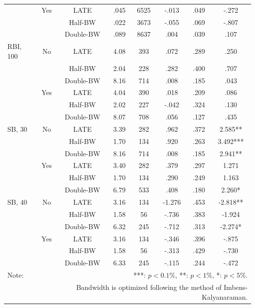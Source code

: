 \documentclass[dvipdfmx, 12pt]{article}
\begin{document}
\begin{table}[!]
\begin{tabular}{lccccccc}
    & Yes & LATE & .045 & 6525 & -.013 & .049 & -.272 \\
    & & Half-BW & .022 & 3673 & -.055 & .069 & -.807 \\
    & &Double-BW & .089 & 8637 & .004 & .039 & .107 \\ \hline

    RBI, 100 & No & LATE & 4.08 & 393 & .072 & .289 & .250 \\
    & &Half-BW & 2.04 & 228 & .282 & .400 & .707 \\
    & &Double-BW & 8.16 & 714 & .008 & .185 & .043 \\ \cline{3-8}

    & Yes & LATE & 4.04 & 390 & .018 & .209 & .086 \\
    & & Half-BW & 2.02 & 227 & -.042 & .324 & .130 \\
    & & Double-BW & 8.07 & 708 & .056 & .127 & .435 \\ \hline

    SB, 30 & No & LATE & 3.39 & 282 & .962 & .372 & 2.585** \\
    & &Half-BW & 1.70 & 134 & .920 & .263 & 3.492*** \\
    & &Double-BW & 8.16 & 714 & .008 & .185 & 2.941** \\ \cline{3-8}

    & Yes & LATE & 3.40 & 282 & .379 & .297 & 1.271 \\
    & & Half-BW & 1.70 & 134 & .290 & .249 & 1.163 \\
    & & Double-BW & 6.79 & 533 & .408 & .180 & 2.260* \\ \hline

    SB, 40 & No & LATE & 3.16 & 134 & -1.276 & .453 & -2.818** \\
    & &Half-BW & 1.58 & 56 & -.736 & .383 & -1.924 \\
    & &Double-BW & 6.32 & 245 & -.712 & .313 & -2.274* \\ \cline{3-8}

    & Yes & LATE & 3.16 & 134 & -.346 & .396 & -.875 \\
    & & Half-BW & 1.58 & 56 & -.313 & .429 & -.730 \\
    & & Double-BW & 6.33 & 245 & -.115 & .244 & -.472 \\ \hline

    Note: & \multicolumn{7}{r}{***: $p<0.1\%$, **: $p<1\%$, *: $p<5\%$.} \\
    & \multicolumn{7}{r}{Bandwidth is optimized following the method of Imbens-Kalyanaraman.}
  \end{tabular}
\end{table}
\end{document}

